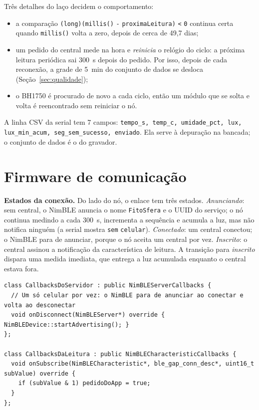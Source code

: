 Três detalhes do laço decidem o comportamento:

\begin{itemize}
  \item a comparação \texttt{(long)(millis()} \texttt{-} \texttt{proximaLeitura)} \texttt{<} \texttt{0}
    continua certa quando \texttt{millis()} volta a zero, depois de cerca
    de 49,7 dias;
  \item um pedido do central mede na hora e \emph{reinicia} o relógio do
    ciclo: a próxima leitura periódica sai \SI{300}{\second} depois do
    pedido. Por isso, depois de cada reconexão, a grade de
    \SI{5}{\minute} do conjunto de dados se desloca (Seção~\ref{sec:qualidade});
  \item o BH1750 é procurado de novo a cada ciclo, então um módulo que
    se solta e volta é reencontrado sem reiniciar o nó.
\end{itemize}

A linha CSV da serial tem 7 campos: \texttt{tempo\_s, temp\_c,
umidade\_pct, lux, lux\_min\_acum, seg\_sem\_sucesso, enviado}. Ela serve
à depuração na bancada; o conjunto de dados é o do gravador.

\section{Firmware de comunicação}
\label{sec:fw-comunicacao}

\noindent\textbf{Estados da conexão.} Do lado do nó, o enlace tem três estados.
\emph{Anunciando}: sem central, o NimBLE anuncia o nome \texttt{FitoSfera}
e o UUID do serviço; o nó continua medindo a cada \SI{300}{\second},
incrementa a sequência e acumula a luz, mas não notifica ninguém (a serial
mostra \texttt{sem} \texttt{celular}). \emph{Conectado}: um central conectou; o
NimBLE para de anunciar, porque o nó aceita um central por vez.
\emph{Inscrito}: o central assinou a notificação da característica de
leitura. A transição para \emph{inscrito} dispara uma medida imediata,
que entrega a luz acumulada enquanto o central estava fora.

\begin{lstlisting}[style=arduino,
  caption={Reconexão e assinatura: quem volta a anunciar e quem dispara a medida},
  label={lst:callbacks}]
class CallbacksDoServidor : public NimBLEServerCallbacks {
  // Um só celular por vez: o NimBLE para de anunciar ao conectar e volta ao desconectar
  void onDisconnect(NimBLEServer*) override { NimBLEDevice::startAdvertising(); }
};

class CallbacksDaLeitura : public NimBLECharacteristicCallbacks {
  void onSubscribe(NimBLECharacteristic*, ble_gap_conn_desc*, uint16_t subValue) override {
    if (subValue & 1) pedidoDoApp = true;
  }
};
\end{lstlisting}

